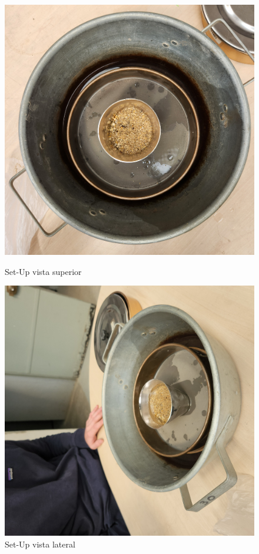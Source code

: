 \begin{figure}[H]
    \centering
    \begin{minipage}{0.4\textwidth}
        \centering
        \includegraphics[angle=-90, width=\textwidth]{FOTOS/cono_1.jpg}
        \caption{Set-Up vista superior}
    \end{minipage}
    \begin{minipage}{0.4\textwidth}
        \centering
        \includegraphics[angle=-90, width=\textwidth]{FOTOS/cono_2.jpg}
        \caption{Set-Up vista lateral}
    \end{minipage}
\end{figure}


